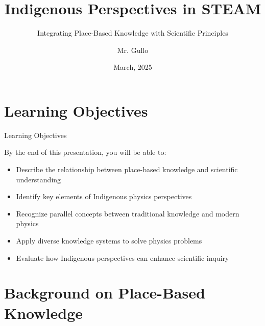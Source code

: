 \documentclass{beamer}
\title[Place-Based Knowledge]{Indigenous Perspectives in STEAM}
\subtitle{Integrating Place-Based Knowledge with Scientific Principles}
\author[Mr. Gullo]{Mr. Gullo}
\institute{Physics Department}
\date[March 2025]{March, 2025}
\begin{document}
\begin{frame}
    \titlepage
\end{frame}

\section{Learning Objectives}

\begin{frame}{Learning Objectives}
    \begin{block}{By the end of this presentation, you will be able to:}
        \begin{itemize}
            \item Describe the relationship between place-based knowledge and scientific understanding
            \item Identify key elements of Indigenous physics perspectives
            \item Recognize parallel concepts between traditional knowledge and modern physics
            \item Apply diverse knowledge systems to solve physics problems
            \item Evaluate how Indigenous perspectives can enhance scientific inquiry
        \end{itemize}
    \end{block}
\end{frame}



\section{Background on Place-Based Knowledge}
\end{document}
